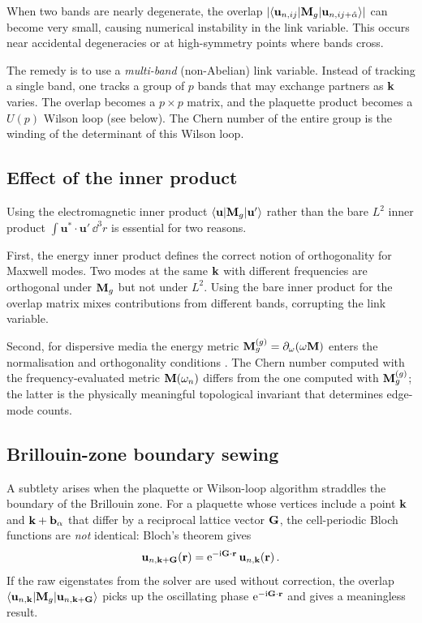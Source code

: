 When two bands are nearly degenerate, the overlap $|\langle\mathbf{u}_{n,ij}
|\mathbf{M}_g|\mathbf{u}_{n,ij+\hat\alpha}\rangle|$ can become very small,
causing numerical instability in the link variable.  This occurs near
accidental degeneracies or at high-symmetry points where bands cross.

The remedy is to use a \emph{multi-band} (non-Abelian) link variable.
Instead of tracking a single band, one tracks a group of $p$ bands
that may exchange partners as $\mathbf{k}$ varies.  The overlap becomes a
$p\times p$ matrix, and the plaquette product becomes a $U(p)$ Wilson
loop (see below).  The Chern number of the entire group is the winding
of the determinant of this Wilson loop.

\subsection{Effect of the inner product}
\label{sec:ch10-inner-product}

Using the electromagnetic inner product
$\langle\mathbf{u}|\mathbf{M}_g|\mathbf{u}'\rangle$ rather than the bare
$L^2$ inner product $\int\mathbf{u}^*\cdot\mathbf{u}'\,\dd^3r$ is
essential for two reasons.

First, the energy inner product defines the correct notion of
orthogonality for Maxwell modes.  Two modes at the same $\mathbf{k}$ with
different frequencies are orthogonal under $\mathbf{M}_g$ but not under
$L^2$.  Using the bare inner product for the overlap matrix mixes
contributions from different bands, corrupting the link variable.

Second, for dispersive media the energy metric
$\mathbf{M}_g^{(g)}=\partial_\omega(\omega\mathbf{M})$ enters the normalisation and
orthogonality conditions \cite{raman2010photonic}.  The Chern number computed with the
frequency-evaluated metric $\mathbf{M}(\omega_n)$ differs from the one
computed with $\mathbf{M}_g^{(g)}$; the latter is the physically meaningful
topological invariant that determines edge-mode counts.

\subsection{Brillouin-zone boundary sewing}
\label{sec:ch10-bz-sewing}

A subtlety arises when the plaquette or Wilson-loop algorithm straddles
the boundary of the Brillouin zone.  For a plaquette whose vertices
include a point $\mathbf{k}$ and $\mathbf{k}+\mathbf{b}_\alpha$ that differ by a
reciprocal lattice vector $\mathbf{G}$, the cell-periodic Bloch functions are
\emph{not} identical: Bloch's theorem gives
\begin{equation}\label{eq:ch10-bloch-sewing}
  \mathbf{u}_{n,\mathbf{k}+\mathbf{G}}(\mathbf{r})
  = \mathrm{e}^{-\mathrm{i}\mathbf{G}\cdot\mathbf{r}}\,
  \mathbf{u}_{n,\mathbf{k}}(\mathbf{r})\,.
\end{equation}
If the raw eigenstates from the solver are used without correction, the
overlap $\langle\mathbf{u}_{n,\mathbf{k}}|\mathbf{M}_g|\mathbf{u}_{n,\mathbf{k}+\mathbf{G}}
\rangle$ picks up the oscillating phase $\mathrm{e}^{-\mathrm{i}\mathbf{G}\cdot\mathbf{r}}$
and gives a meaningless result.


